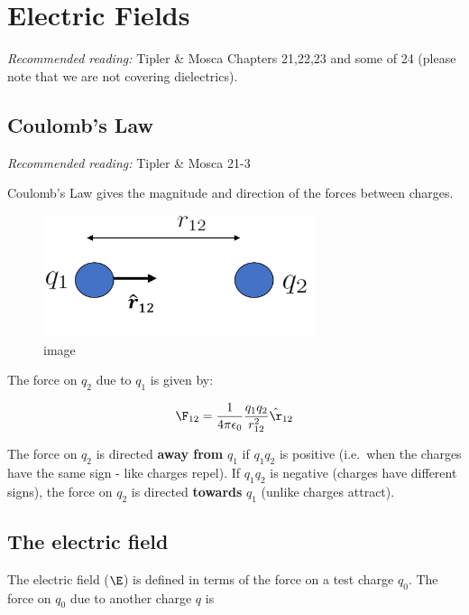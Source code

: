 \documentclass[
]{book}
\begin{document}
\hypertarget{electric-fields}{%
\chapter{Electric Fields}\label{electric-fields}}

\emph{Recommended reading:} Tipler \& Mosca Chapters 21,22,23 and some of 24
(please note that we are not covering dielectrics).

\hypertarget{coulombs-law}{%
\section{Coulomb's Law}\label{coulombs-law}}

\emph{Recommended reading:} Tipler \& Mosca 21-3

Coulomb's Law gives the magnitude and direction of the forces between
charges.

\begin{figure}
\centering
\includegraphics[width=80mm,height=\textheight]{Figures/coulomb1.png}
\caption{image}
\end{figure}

The force on \(q_2\) due to \(q_1\) is given by:

\[\label{eq:coulomb}
\F_{12}= \frac{1}{4\pi \epsilon_0} \frac{q_1 q_2}{r_{12}^2} \hat{\r}_{12}\]

The force on \(q_2\) is directed \textbf{away from} \(q_1\) if \(q_1 q_2\) is
positive (i.e.~when the charges have the same sign - like charges
repel). If \(q_1 q_2\) is negative (charges have different signs), the
force on \(q_2\) is directed \textbf{towards} \(q_1\) (unlike charges attract).

\hypertarget{the-electric-field}{%
\section{The electric field}\label{the-electric-field}}

The electric field (\(\E\)) is defined in terms of the force on a test
charge \(q_0\). The force on \(q_0\) due to another charge \(q\) is
\end{document}
